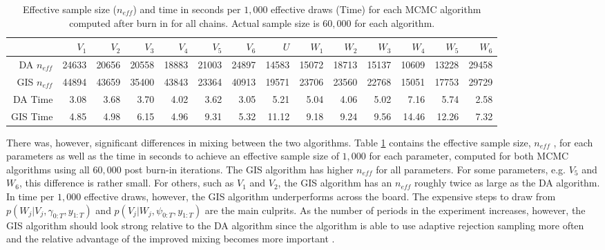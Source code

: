\documentclass[graybox]{svmult}
\begin{document}
\begin{table}[ht]
\centering
\begin{tabular}{rrrrrrrrrrrrrr}
  \hline
 & $V_1$ & $V_2$ & $V_3$ & $V_4$ & $V_5$ & $V_6$ & $U$ & $W_1$ & $W_2$ & $W_3$ & $W_4$ & $W_5$ & $W_6$ \\ 
  \hline
DA $n_{eff}$ & 24633 & 20656 & 20558 & 18883 & 21003 & 24897 & 14583 & 15072 & 18713 & 15137 & 10609 & 13228 & 29458 \\ 
GIS $n_{eff}$   & 44894 & 43659 & 35400 & 43843 & 23364 & 40913 & 19571 & 23706 & 23560 & 22768 & 15051 & 17753 & 29729 \\ 
DA Time & 3.08 & 3.68 & 3.70 & 4.02 & 3.62 & 3.05 & 5.21 & 5.04 & 4.06 & 5.02 & 7.16 & 5.74 & 2.58 \\ 
GIS Time & 4.85 & 4.98 & 6.15 & 4.96 & 9.31 & 5.32 & 11.12 & 9.18 & 9.24 & 9.56 & 14.46 & 12.26 & 7.32 \\ 
   \hline
\end{tabular}
\caption{Effective sample size ($n_{eff}$) and time in seconds per $1,000$ effective draws (Time) for each MCMC algorithm computed after burn in for all chains. Actual sample size is $60,000$ for each algorithm.}
\label{tab:neff}
\end{table}

There was, however, significant differences in mixing between the two algorithms. Table \ref{tab:neff} contains the effective sample size, $n_{eff}$ \citep{gelman2013bayesian}, for each parameters as well as the time in seconds to achieve an effective sample size of $1,000$ for each parameter, computed for both MCMC algorithms using all $60,000$ post burn-in iterations. The GIS algorithm has higher $n_{eff}$ for all parameters. For some parameters, e.g. $V_5$ and $W_6$, this difference is rather small. For others, such as $V_1$ and $V_2$, the GIS algorithm has an $n_{eff}$ roughly twice as large as the DA algorithm. In time per $1,000$ effective draws, however, the GIS algorithm underperforms across the board. The expensive steps to draw from $p(W_j|V_j,\gamma_{0:T},y_{1:T})$ and $p(V_j|W_j,\psi_{0:T},y_{1:T})$ are the main culprits. As the number of periods in the experiment increases, however, the GIS algorithm should look strong relative to the DA algorithm since the algorithm is able to use adaptive rejection sampling more often and the relative advantage of the improved mixing becomes more important \citep{simpson2014interweaving}. 
\end{document}

